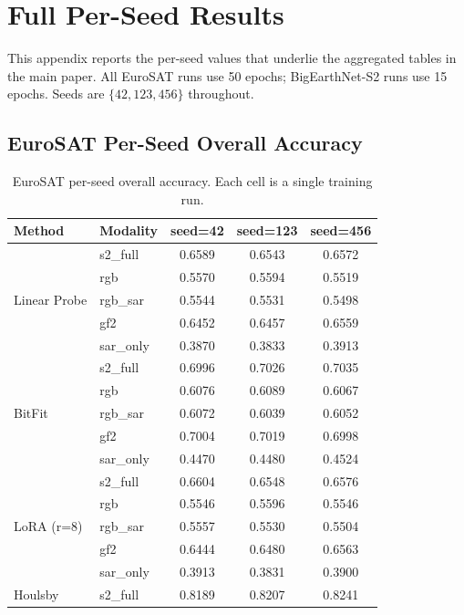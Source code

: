 \appendix

\section{Full Per-Seed Results}
\label{app:per-seed}

This appendix reports the per-seed values that underlie the aggregated tables in the main paper. All EuroSAT runs use 50 epochs; BigEarthNet-S2 runs use 15 epochs. Seeds are $\{42, 123, 456\}$ throughout.

\subsection{EuroSAT Per-Seed Overall Accuracy}

\begin{table}[h]
\centering
\small
\caption{EuroSAT per-seed overall accuracy. Each cell is a single training run.}
\label{tab:eurosat-per-seed}
\begin{tabular}{llccc}
\toprule
Method & Modality & seed=42 & seed=123 & seed=456 \\
\midrule
\multirow{5}{*}{Linear Probe}
 & s2\_full   & 0.6589 & 0.6543 & 0.6572 \\
 & rgb        & 0.5570 & 0.5594 & 0.5519 \\
 & rgb\_sar   & 0.5544 & 0.5531 & 0.5498 \\
 & gf2        & 0.6452 & 0.6457 & 0.6559 \\
 & sar\_only  & 0.3870 & 0.3833 & 0.3913 \\
\midrule
\multirow{5}{*}{BitFit}
 & s2\_full   & 0.6996 & 0.7026 & 0.7035 \\
 & rgb        & 0.6076 & 0.6089 & 0.6067 \\
 & rgb\_sar   & 0.6072 & 0.6039 & 0.6052 \\
 & gf2        & 0.7004 & 0.7019 & 0.6998 \\
 & sar\_only  & 0.4470 & 0.4480 & 0.4524 \\
\midrule
\multirow{5}{*}{LoRA (r=8)}
 & s2\_full   & 0.6604 & 0.6548 & 0.6576 \\
 & rgb        & 0.5546 & 0.5596 & 0.5546 \\
 & rgb\_sar   & 0.5557 & 0.5530 & 0.5504 \\
 & gf2        & 0.6444 & 0.6480 & 0.6563 \\
 & sar\_only  & 0.3913 & 0.3831 & 0.3900 \\
\midrule
\multirow{5}{*}{Houlsby}
 & s2\_full   & 0.8189 & 0.8207 & 0.8241 \\

\end{tabular}
\end{table}
